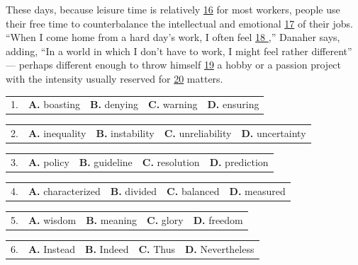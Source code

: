 \documentclass[UTF8,11pt]{ctexart}
\begin{document}
These days, because leisure time is relatively \uline{16} for most workers, people use their free time to counterbalance the intellectual and emotional \uline{17} of their jobs. “When I come home from a hard day’s work, I often feel \uline{18 },” Danaher says, adding, “In a world in which I don’t have to work, I might feel rather different” — perhaps different enough to throw himself \uline{19} a hobby or a passion project with the intensity usually reserved for \uline{20} matters.


\noindent\begin{tabularx}{\linewidth}{@{}lXXXX@{}}1. & \textbf{A.} boasting & \textbf{B.} denying & \textbf{C.} warning & \textbf{D.} ensuring\\\end{tabularx}\par

\noindent\begin{tabularx}{\linewidth}{@{}lXXXX@{}}2. & \textbf{A.} inequality & \textbf{B.} instability & \textbf{C.} unreliability & \textbf{D.} uncertainty\\\end{tabularx}\par

\noindent\begin{tabularx}{\linewidth}{@{}lXXXX@{}}3. & \textbf{A.} policy & \textbf{B.} guideline & \textbf{C.} resolution & \textbf{D.} prediction\\\end{tabularx}\par

\noindent\begin{tabularx}{\linewidth}{@{}lXXXX@{}}4. & \textbf{A.} characterized & \textbf{B.} divided & \textbf{C.} balanced & \textbf{D.} measured\\\end{tabularx}\par

\noindent\begin{tabularx}{\linewidth}{@{}lXXXX@{}}5. & \textbf{A.} wisdom & \textbf{B.} meaning & \textbf{C.} glory & \textbf{D.} freedom\\\end{tabularx}\par

\noindent\begin{tabularx}{\linewidth}{@{}lXXXX@{}}6. & \textbf{A.} Instead & \textbf{B.} Indeed & \textbf{C.} Thus & \textbf{D.} Nevertheless\\\end{tabularx}\par
\end{document}

